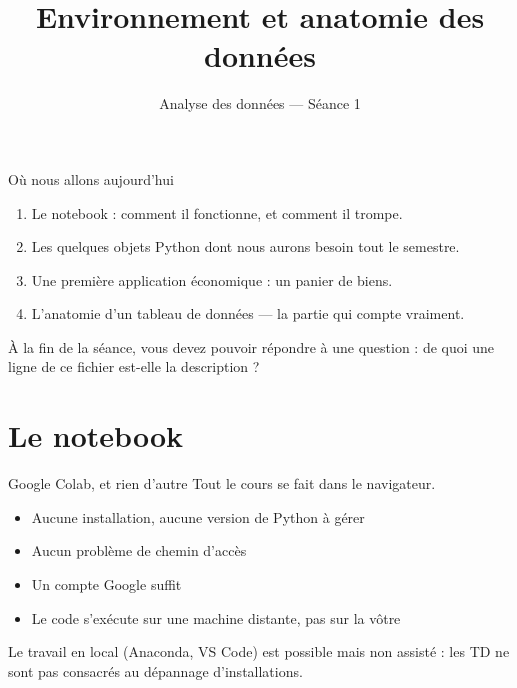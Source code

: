 \documentclass[10pt,aspectratio=169]{beamer}
\title{Environnement et anatomie des données}
\subtitle{Analyse des données --- Séance 1}
\begin{document}
\maketitle

\begin{frame}{Où nous allons aujourd'hui}
\begin{enumerate}
  \item Le notebook : comment il fonctionne, et comment il trompe.
  \item Les quelques objets Python dont nous aurons besoin tout le semestre.
  \item Une première application économique : un panier de biens.
  \item L'anatomie d'un tableau de données --- la partie qui compte vraiment.
\end{enumerate}

\vspace{1.5em}
À la fin de la séance, vous devez pouvoir répondre à une question : \alert{de quoi une ligne de ce fichier est-elle la description ?}
\end{frame}

\section{Le notebook}

\begin{frame}{Google Colab, et rien d'autre}
Tout le cours se fait dans le navigateur.

\vspace{1em}
\begin{itemize}
  \item Aucune installation, aucune version de Python à gérer
  \item Aucun problème de chemin d'accès
  \item Un compte Google suffit
  \item Le code s'exécute sur une machine distante, pas sur la vôtre
\end{itemize}

\vspace{1.2em}
Le travail en local (Anaconda, VS Code) est possible mais \alert{non assisté} : les TD ne sont pas consacrés au dépannage d'installations.
\end{frame}
\end{document}
